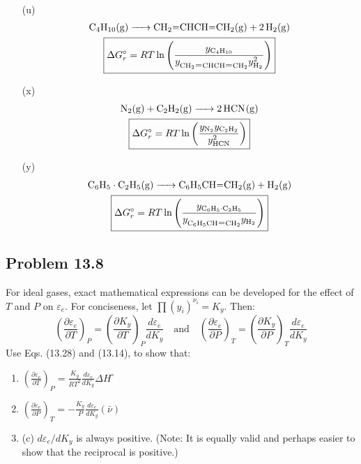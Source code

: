 \begin{solution}
\begin{enumerate}
\begin{gather*}
      \end{gather*}
    \item[(u)]
      \begin{gather*}
        \ce{C4H10(g) -> CH2=CHCH=CH2(g) + 2H2(g)} \\
        \boxed{\Delta G_r^\circ =
        RT\ln\left(\frac{y_{\ce{C4H10}}}{y_{\ce{CH2=CHCH=CH2}}y_{\ce{H2}}^2}\right)}
      \end{gather*}
    \item[(x)]
      \begin{gather*}
        \ce{N2(g) + C2H2(g) -> 2HCN(g)} \\
        \boxed{\Delta G_r^\circ =
        RT\ln\left(\frac{y_{\ce{N2}}y_{\ce{C2H2}}}{y_{\ce{HCN}}^2}\right)}
      \end{gather*}
    \item[(y)]
      \begin{gather*}
        \ce{C6H5\cdot C2H5(g) -> C6H5CH=CH2(g) + H2(g)} \\
        \boxed{\Delta G_r^\circ =
          RT\ln\left(\frac{y_{\ce{C6H5\cdot
        C2H5}}}{y_{\ce{C6H5CH=CH2}}y_{\ce{H2}}}\right)}
      \end{gather*}
  \end{enumerate}
\end{solution}

\subsection*{Problem 13.8}
For ideal gases, exact mathematical expressions can be developed for
the effect of $T$ and $P$ on $\varepsilon_e$. For conciseness, let
$\prod (y_i)^{\nu_i} = K_y$. Then:
$$
\left(\frac{\partial \varepsilon_e}{\partial T}\right)_P =
\left(\frac{\partial K_y}{\partial T}\right)_P
\frac{d\varepsilon_e}{dK_y} \quad \text{and} \quad
\left(\frac{\partial \varepsilon_e}{\partial P}\right)_T =
\left(\frac{\partial K_y}{\partial P}\right)_T \frac{d\varepsilon_e}{dK_y}
$$
Use Eqs. (13.28) and (13.14), to show that:
\begin{enumerate}[label=(\alph*)]
  \item \(\displaystyle \left(\frac{\partial \varepsilon_e}{\partial
    T}\right)_P = \frac{K_y}{RT^2} \frac{d\varepsilon_e}{dK_y} \Delta H^\circ\)
  \item \(\displaystyle \left(\frac{\partial \varepsilon_e}{\partial
    P}\right)_T = -\frac{K_y}{P} \frac{d\varepsilon_e}{dK_y} (\bar{\nu})\)
  \item (c) $d\varepsilon_e / dK_y$ is always positive. (Note: It is
    equally valid and perhaps easier to show that the reciprocal is positive.)
\end{enumerate}
